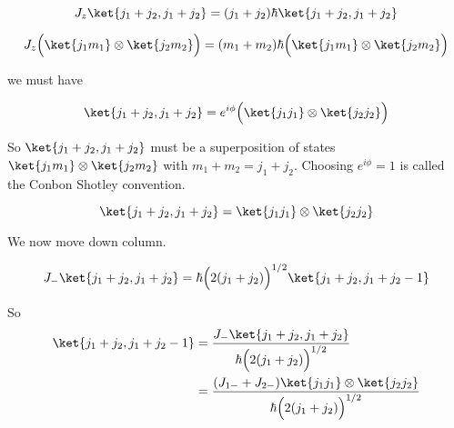 \begin{equation}\label{eqn:qmTwoL17:600}
J_z
\ket{j_1 + j_2, j_1 + j_2}
= 
(j_1 + j_2) \hbar
\ket{j_1 + j_2, j_1 + j_2}
\end{equation}

\begin{equation}\label{eqn:qmTwoL17:620}
J_z 
\Bigl(\ket{j_1 m_1} \otimes \ket{j_2 m_2} \Bigr)
= 
(m_1 + m_2) \hbar
\Bigl(\ket{j_1 m_1} \otimes \ket{j_2 m_2} \Bigr)
\end{equation}

we must have

\begin{equation}\label{eqn:qmTwoL17:640}
\ket{j_1 + j_2, j_1 + j_2}
= e^{i\phi}
\Bigl(\ket{j_1 j_1} \otimes \ket{j_2 j_2} \Bigr)
\end{equation}

So $\ket{j_1 + j_2, j_1 + j_2}$ must be a superposition of states $\ket{j_1 m_1} \otimes \ket{j_2 m_2} $ with $m_1 + m_2 = j_1 + j_2$.  Choosing $e^{i\phi} = 1$ is called the Conbon Shotley convention.

\begin{equation}\label{eqn:qmTwoL17:660}
\ket{j_1 + j_2, j_1 + j_2}
= 
\ket{j_1 j_1} \otimes \ket{j_2 j_2}
\end{equation}

We now move down column.

\begin{equation}\label{eqn:qmTwoL17:680}
J_{-} \ket{j_1 + j_2, j_1 + j_2}
=
\hbar
\Bigl(
2 (j_1 + j_2)
\Bigr)^{1/2}
\ket{j_1 + j_2, j_1 + j_2 - 1}
\end{equation}

So 
\begin{align*}
\ket{j_1 + j_2, j_1 + j_2 - 1}
&=
\frac{
J_{-} \ket{j_1 + j_2, j_1 + j_2}
}{
\hbar
\Bigl(
2 (j_1 + j_2)
\Bigr)^{1/2}
} \\
&=
\frac{
(J_{1-} + J_{2-}) \ket{j_1 j_1} \otimes \ket{j_2 j_2}
}{
\hbar
\Bigl(
2 (j_1 + j_2)
\Bigr)^{1/2}
}
\end{align*}

\EndArticle
